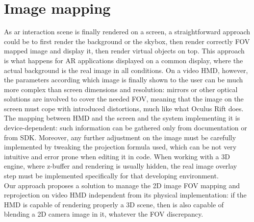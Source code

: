 \section{Image mapping}
As ar interaction scene is finally rendered on a screen, a straightforward approach could be to first render the background or the skybox, then render correctly FOV mapped image and display it, then render virtual objects on top. This approach is what happens for AR applications displayed on a common display, where the actual background is the real image in all conditions. On a video HMD, however, the parameters according which image is finally shown to the user can be much more complex than screen dimensions and resolution: mirrors or other optical solutions are involved to cover the needed FOV, meaning that the image on the screen must cope with introduced distortions, much like what Oculus Rift does. The mapping between HMD and the screen and the system implementing it is device-dependent: such information can be gathered only from documentation or from SDK. Moreover, any further adjustment on the image must be carefully implemented by tweaking the projection formula used, which can be not very intuitive and error prone when editing it in code. When working with a 3D engine, where z-buffer and rendering is usually hidden, the real image overlay step must be implemented specifically for that developing environment.\\
Our approach proposes a solution to manage the 2D image FOV mapping and reprojection on video HMD independent from its physical implementation: if the HMD is capable of rendering properly a 3D scene, then is also capable of blending a 2D camera image in it, whatever the FOV discrepancy.

